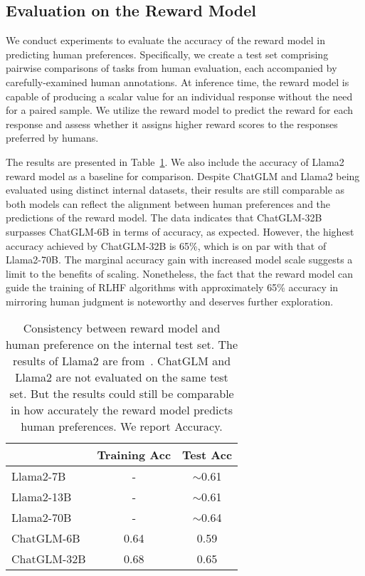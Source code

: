 \subsection{Evaluation on the Reward Model}

We conduct experiments to evaluate the accuracy of the reward model in predicting human preferences. Specifically, we create a test set comprising pairwise comparisons of tasks from human evaluation, each accompanied by carefully-examined human annotations. 
At inference time, the reward model is capable of producing a scalar value for an individual response without the need for a paired sample. 
We utilize the reward model to predict the reward for each response and assess whether it assigns higher reward scores to the responses preferred by humans.

The results are presented in Table~\ref{tab:reward_model}. We also include the accuracy of Llama2 reward model as a baseline for comparison. Despite ChatGLM and Llama2 being evaluated using distinct internal datasets, their results are still comparable as both models can reflect the alignment between human preferences and the predictions of the reward model. The data indicates that ChatGLM-32B surpasses ChatGLM-6B in terms of accuracy, as expected. However, the highest accuracy achieved by ChatGLM-32B is 65\%, which is on par with that of Llama2-70B. The marginal accuracy gain with increased model scale suggests a limit to the benefits of scaling. Nonetheless, the fact that the reward model can guide the training of RLHF algorithms with approximately 65\% accuracy in mirroring human judgment is noteworthy and deserves further exploration.

\begin{table}[]
    \centering
    \caption{Consistency between reward model and human preference on the internal test set. \textmd{The results of Llama2 are from~\cite{touvron2023llama}. ChatGLM and Llama2 are not evaluated on the same test set. But the results could still be comparable in how accurately the reward model predicts human preferences. We report Accuracy. }}
    \begin{tabular}{l|cc}
    \toprule[1.2pt]
         &  Training Acc & Test Acc \\
    \midrule
        Llama2-7B &  - & $\sim$0.61\\
        Llama2-13B & - & $\sim$0.61 \\
        Llama2-70B & - & $\sim$0.64 \\
        ChatGLM-6B & 0.64 & 0.59 \\
        ChatGLM-32B & 0.68 & 0.65 \\
    \bottomrule[1.2pt]
    \end{tabular}
    \label{tab:reward_model}
\end{table}

